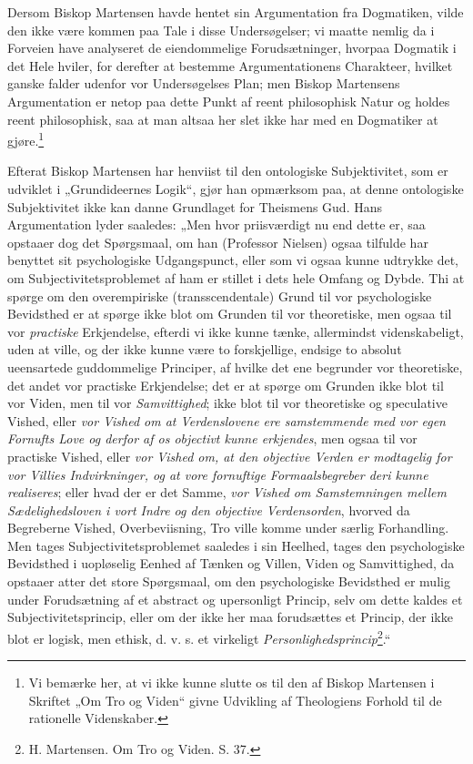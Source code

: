 \documentclass[12pt,a4paper]{book}
\newcommand{\opage}[1]{\marginnote{\footnotesize\textit{[#1]}}}
\begin{document}
Dersom Biskop Martensen havde hentet sin Argumentation
fra Dogmatiken, vilde den ikke være kommen
paa Tale i disse Undersøgelser; vi maatte nemlig da i
Forveien have analyseret de eiendommelige Forudsætninger,
hvorpaa Dogmatik i det Hele hviler, for derefter
at bestemme Argumentationens Charakteer, hvilket ganske
falder udenfor vor Undersøgelses Plan; men Biskop
Martensens Argumentation er netop paa dette Punkt af
reent philosophisk Natur og holdes reent philosophisk,
saa at man altsaa her slet ikke har med en Dogmatiker
at gjøre.\footnote{Vi bemærke her, at vi ikke kunne slutte os til den af Biskop
Martensen i Skriftet „Om Tro og Viden“ givne Udvikling
af Theologiens Forhold til de rationelle Videnskaber.}

Efterat Biskop Martensen har henviist til den ontologiske
Subjektivitet, som er udviklet i „Grundideernes
Logik“, gjør han opmærksom paa, at denne ontologiske
Subjektivitet ikke kan danne Grundlaget for Theismens
Gud. Hans Argumentation lyder saaledes: „Men hvor
priisværdigt nu end dette er, saa opstaaer dog det
Spørgsmaal, om han (Professor Nielsen) ogsaa tilfulde
har benyttet sit psychologiske Udgangspunct, eller som vi
ogsaa kunne udtrykke det, om Subjectivitetsproblemet
\opage{50}\setcounter{footnote}{0}%
af ham er stillet i dets hele Omfang og Dybde. Thi at
spørge om den overempiriske (transscendentale) Grund til
vor psychologiske Bevidsthed er at spørge ikke blot om
Grunden til vor theoretiske, men ogsaa til vor \emph{practiske}
Erkjendelse, efterdi vi ikke kunne tænke, allermindst
videnskabeligt, uden at ville, og der ikke kunne være to
forskjellige, endsige to absolut ueensartede guddommelige
Principer, af hvilke det ene begrunder vor theoretiske,
det andet vor practiske Erkjendelse; det er at spørge om
Grunden ikke blot til vor Viden, men til vor \emph{Samvittighed};
ikke blot til vor theoretiske og speculative
Vished, eller \emph{vor Vished om at Verdenslovene
ere samstemmende med vor egen Fornufts Love
og derfor af os objectivt kunne erkjendes}, men
ogsaa til vor practiske Vished, eller \emph{vor Vished om,
at den objective Verden er modtagelig for vor
Villies Indvirkninger, og at vore fornuftige
Formaalsbegreber deri kunne realiseres}; eller
hvad der er det Samme, \emph{vor Vished om Samstemningen
mellem Sædelighedsloven i vort
Indre og den objective Verdensorden}, hvorved
da Begreberne Vished, Overbeviisning, Tro ville komme
under særlig Forhandling. Men tages Subjectivitetsproblemet
saaledes i sin Heelhed, tages den psychologiske
Bevidsthed i uopløselig Eenhed af Tænken og Villen,
Viden og Samvittighed, da opstaaer atter det store
Spørgsmaal, om den psychologiske Bevidsthed er mulig
under Forudsætning af et abstract og upersonligt Princip,
selv om dette kaldes et Subjectivitetsprincip, eller om
\opage{51}\setcounter{footnote}{0}%
der ikke her maa forudsættes et Princip, der ikke blot
er logisk, men ethisk, d. v. s. et virkeligt \emph{Personlighedsprincip}\footnote{H. Martensen. Om Tro og Viden. S. 37.}.“
\end{document}
